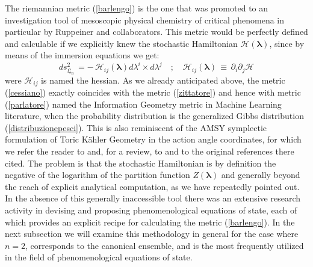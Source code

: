 \documentclass[10pt,a4paper]{article}
\begin{document}
The riemannian metric (\ref{barlengo}) is the one that was promoted to an investigation tool
of mesoscopic physical chemistry of critical phenomena
in particular by Ruppeiner and collaborators.
This  metric would be perfectly defined and calculable if we explicitly knew
the stochastic  Hamiltonian
$\mathcal{H}(\pmb{\lambda})$, since by means of the immersion equations
we get:
\begin{equation}\label{cessiano}
     ds^2_{\mathfrak{L}_n} \, = -\, \mathcal{H}_{ij}
     (\pmb{\lambda}) d\lambda^i
     \times d\lambda^j \quad ; \quad \mathcal{H}_{ij}
     (\pmb{\lambda})\, \equiv \,\partial_i\partial_j\mathcal{H}
\end{equation}
were $\mathcal{H}_{ij}$  is named the hessian. As we already anticipated above, the metric (\ref{cessiano}) exactly coincides with the metric (\ref{zittatore}) and hence with metric (\ref{parlatore}) named the Information Geometry metric in Machine Learning literature, when the probability distribution is the generalized Gibbs distribution (\ref{distribuzionepesci}). This is also reminiscent of the AMSY symplectic formulation of Toric K\"ahler Geometry in the action angle coordinates, for which we refer the reader to \cite{Bianchi_2021,bruzzo2023d3brane} and, for a review, to \cite{fre2023lectures} and to the original references there cited. The problem is that the stochastic Hamiltonian is by definition the negative of the logarithm of the partition function $Z(\pmb{\lambda})$ and generally beyond the reach of explicit analytical computation, as we have repeatedly pointed out. In the absence of this generally inaccessible tool there was an extensive research activity in  devising and proposing phenomenological equations of state, each of which provides an explicit recipe for calculating the metric (\ref{barlengo}). In the next subsection we will examine this methodology in general for the case where
$n=2$, corresponds to the canonical ensemble, and is the most frequently utilized in the field of phenomenological equations of state.
\end{document}
